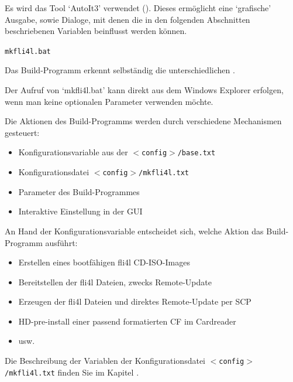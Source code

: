 
  Es wird das Tool `AutoIt3' verwendet ().
  Dieses ermöglicht eine `grafische' Ausgabe, sowie Dialoge, mit denen die in
  den folgenden Abschnitten beschriebenen Variablen beinflusst werden können.

  \begin{description}
    \item \texttt{mkfli4l.bat}
  \end{description}

  Das Build-Programm erkennt selbständig die unterschiedlichen .


  Der Aufruf von `mkfli4l.bat' kann direkt aus dem Windows Explorer
  erfolgen, wenn man keine optionalen Parameter verwenden möchte.

  Die Aktionen des Build-Programms werden durch verschiedene Mechanismen gesteuert:
  \begin{itemize}
    \item Konfigurationsvariable  aus der
          \texttt{$<$config$>$/base.txt}
    \item Konfigurationsdatei \texttt{$<$config$>$/mkfli4l.txt}
    \item Parameter des Build-Programmes
    \item Interaktive Einstellung in der GUI
  \end{itemize}

  An Hand der Konfigurationsvariable 
  entscheidet sich, welche Aktion das Build-Programm ausführt:
  \begin{itemize}
    \item Erstellen eines bootfähigen fli4l CD-ISO-Images
    \item Bereitstellen der fli4l Dateien, zwecks Remote-Update
    \item Erzeugen der fli4l Dateien und direktes Remote-Update per SCP
    \item HD-pre-install einer passend formatierten CF im Cardreader
    \item usw.
  \end{itemize}

  Die Beschreibung der Variablen der Konfigurationsdatei
  \texttt{$<$config$>$/mkfli4l.txt} finden Sie im Kapitel
  .

